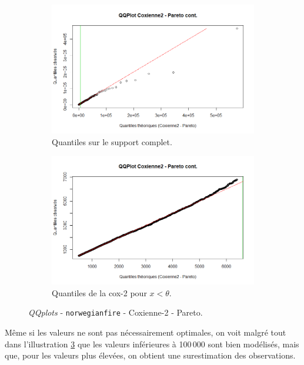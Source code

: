 		\begin{figure}[H]
			\begin{center}
				\begin{subfigure}[b]{0.45\textwidth}
					\includegraphics[scale=0.40]{Graphiques/QQ_Cox_Pa_cont} 
					\caption{Quantiles sur le support complet.} \label{QQplot_Cox_Pa_con}
				\end{subfigure}
				\begin{subfigure}[b]{0.4\textwidth}
					\includegraphics[scale=0.40]{Graphiques/QQ_Cox_Pa_cont_t1} 
					\caption{Quantiles de la cox-2 pour $x<\theta$.} \label{QQplot_Cox_Pa_con_2}
				\end{subfigure}
				\renewcommand{\figurename}{Illustration}
				\caption{\textit{QQplots} - \texttt{norwegianfire} - Coxienne-2 - Pareto.}\label{QQplot_Cox_Pa_con_3}
			\end{center}
		\end{figure}
		
		Même si les valeurs ne sont pas nécessairement optimales, on voit malgré tout dans l'illustration \ref{QQplot_Cox_Pa_con_3} que les valeurs inférieures à 100\,000 sont bien modélisés, mais que, pour les valeurs plus élevées, on obtient une surestimation des observations. \\
		
